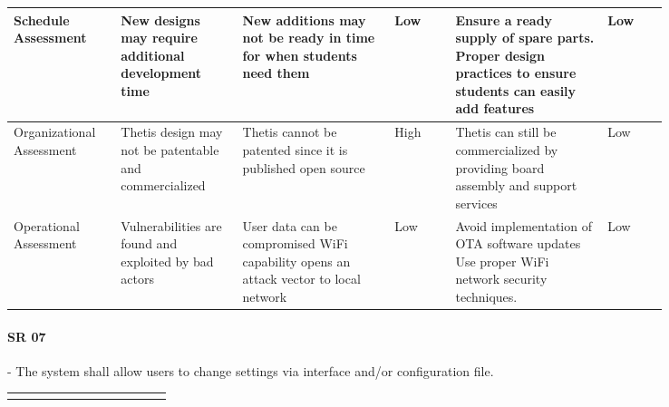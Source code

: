 \begin{landscape}
{\begin{longtable}{| p{0.12\linewidth} | p{0.16\linewidth} |  p{0.20\linewidth} | p{0.08\linewidth} | p{0.20\linewidth} | p{0.08\linewidth} |}
	\hline
	Schedule \newline Assessment & New designs may require additional development time & New additions may not be ready in time for when students need them & \cellcolor{green} Low & Ensure a ready supply of spare parts. \newline Proper design practices to ensure students can easily add features & \cellcolor{green} Low \\
	\hline
	Organizational \newline Assessment & Thetis design may not be patentable and commercialized & Thetis cannot be patented since it is published open source & \cellcolor{red} High & Thetis can still be commercialized by providing board assembly and support services & \cellcolor{green} Low \\
	\hline
	Operational \newline Assessment & Vulnerabilities are found and exploited by bad actors & User data can be compromised \newline WiFi capability opens an attack vector to local network & \cellcolor{green} Low & Avoid implementation of OTA software updates \newline Use proper WiFi network security techniques. & \cellcolor{green} Low
	\label{tab:sr06_feasibility}
\end{longtable}
}
\newpage



\paragraph*{SR 07} - The system shall allow users to change settings via interface and/or configuration file.

{\fontsize{8pt}{8pt}\selectfont
\begin{longtable}{| p{0.12\linewidth} | p{0.16\linewidth} |  p{0.20\linewidth} | p{0.08\linewidth} | p{0.20\linewidth} | p{0.08\linewidth} |}
	\hline \endlastfoot
	

\end{longtable}}
\end{landscape}
